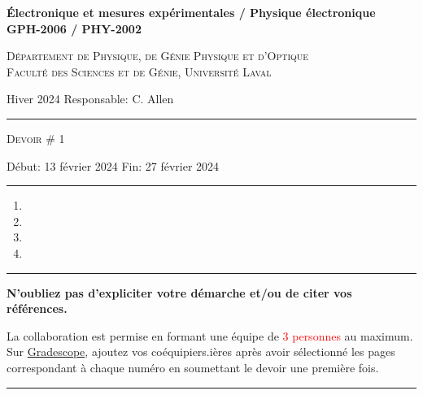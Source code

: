 \documentclass[english,french,12pt]{article}
\newcommand{\onlyinsubfile}[1]{#1} %
\begin{document}
\renewcommand{\onlyinsubfile}[1]{}
%
%
\begin{center}
    \textbf{\large{Électronique et mesures expérimentales / Physique électronique}}\\
    \vspace{0.2em}
    \textbf{GPH-2006 / PHY-2002}\par
    \textsc{Département de Physique, de Génie Physique et d'Optique\\
    Faculté des Sciences et de Génie, Université Laval}
\end{center}
\noindent Hiver 2024 \hfill Responsable: C. Allen
\vspace{0.2em}
\hrule
\vspace{-1.5ex}
\begin{center}
    \textsc{Devoir \# 1}
\end{center}
\vspace{-4ex}
Début: 13 février 2024 \hfill Fin: 27 février 2024\par
\vspace{0.4em}
\hrule
\justify
%

\begin{enumerate}[label=\Roman*., itemsep=3ex, wide, labelwidth=!, labelindent=0pt]
    \setcounter{enumi}{0}
    \item 
    \item 
    \item 
    \vspace{5ex}
    \item 
\end{enumerate}
 
\vfill
\hrule
\vspace{0.3em}
\centering
\textbf{N'oubliez pas d'expliciter votre démarche et/ou de citer vos références.}\par
\vspace{-0.3em}
La collaboration est permise en formant une équipe de \textcolor{red}{3 personnes} au maximum. Sur \href{https://www.gradescope.com/}{Gradescope}, ajoutez vos coéquipiers.ières après avoir sélectionné les pages correspondant à chaque numéro en soumettant le devoir une première fois.\par
\vspace{1em}
\hrule
\end{document}
